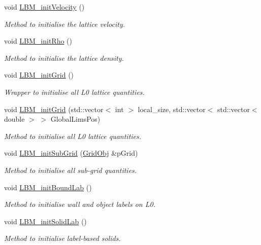 \begin{DoxyCompactItemize}
void \hyperlink{class_grid_obj_aa8041f7344af6cf9732199aa107fdbc6}{L\+B\+M\+\_\+init\+Velocity} ()
\begin{DoxyCompactList}\small\item\em Method to initialise the lattice velocity. \end{DoxyCompactList}\item 
void \hyperlink{class_grid_obj_aac0e8a3fe74c69b3308ef3e19100f95c}{L\+B\+M\+\_\+init\+Rho} ()
\begin{DoxyCompactList}\small\item\em Method to initialise the lattice density. \end{DoxyCompactList}\item 
void \hyperlink{class_grid_obj_aeea74cc13001620abec1ba819233f714}{L\+B\+M\+\_\+init\+Grid} ()
\begin{DoxyCompactList}\small\item\em Wrapper to initialise all L0 lattice quantities. \end{DoxyCompactList}\item 
void \hyperlink{class_grid_obj_afbaf6155b26acb6a21dcf7be68520607}{L\+B\+M\+\_\+init\+Grid} (std\+::vector$<$ int $>$ local\+\_\+size, std\+::vector$<$ std\+::vector$<$ double $>$ $>$ Global\+Lims\+Pos)
\begin{DoxyCompactList}\small\item\em Method to initialise all L0 lattice quantities. \end{DoxyCompactList}\item 
void \hyperlink{class_grid_obj_a697f4d7fc6c9ed18e609528847b1e175}{L\+B\+M\+\_\+init\+Sub\+Grid} (\hyperlink{class_grid_obj}{Grid\+Obj} \&p\+Grid)
\begin{DoxyCompactList}\small\item\em Method to initialise all sub-\/grid quantities. \end{DoxyCompactList}\item 
void \hyperlink{class_grid_obj_a4b6edceeda49496365e725eb67931961}{L\+B\+M\+\_\+init\+Bound\+Lab} ()
\begin{DoxyCompactList}\small\item\em Method to initialise wall and object labels on L0. \end{DoxyCompactList}\item 
void \hyperlink{class_grid_obj_a5dd08730d7cdea576bb4b337786a9bcf}{L\+B\+M\+\_\+init\+Solid\+Lab} ()
\begin{DoxyCompactList}\small\item\em Method to initialise label-\/based solids. \end{DoxyCompactList}\item 

\end{DoxyCompactItemize}
